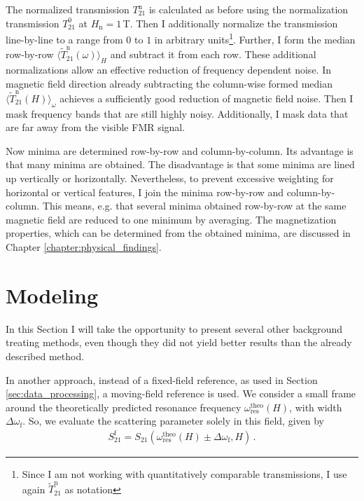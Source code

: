 The normalized transmission $T_{21}^\text{n}$ is calculated as before using the normalization transmission $T_{21}^0$ at $H_\text{n}=1\,$T. Then I additionally normalize the transmission line-by-line to a range from $0$ to $1$ in arbitrary units\footnote{Since I am not working with quantitatively comparable transmissions, I use again $\widetilde{T}_{21}^\text{n}$ as notation}. Further, I form the median row-by-row $\langle\widetilde{T}_{21}^\text{n}(\omega)\rangle_H$ and subtract it from each row. These additional normalizations allow an effective reduction of frequency dependent noise. In magnetic field direction already subtracting the column-wise formed median $\langle\widetilde{T}_{21}^\text{n}(H)\rangle_\omega$ achieves a sufficiently good reduction of magnetic field noise. Then I mask frequency bands that are still highly noisy. Additionally, I mask data that are far away from the visible FMR signal.

Now minima are determined row-by-row and column-by-column. Its advantage is that many minima are obtained. The disadvantage is that some minima are lined up vertically or horizontally. Nevertheless, to prevent excessive weighting for horizontal or vertical features, I join the minima row-by-row and column-by-column. This means, e.g. that several minima obtained row-by-row at the same magnetic field are reduced to one minimum by averaging. The magnetization properties, which can be determined from the obtained minima, are discussed in Chapter \ref{chapter:physical_findings}.

\section{Modeling}
In this Section I will take the opportunity to present several other background treating methods, even though they did not yield better results than the already described method.

In another approach, instead of a fixed-field reference, as used in Section \ref{sec:data_processing}, a {moving-field reference} is used. We consider a small frame around the theoretically predicted resonance frequency $\omega_\text{res}^\text{theo}(H)$, with width $\Delta\omega_\text{f}$. So, we evaluate the scattering parameter solely in this field, given by
\begin{align}
    S_{21}^\text{f}=S_{21}(\omega_\text{res}^\text{theo}(H)\pm\Delta\omega_\text{f},H)\,.
\end{align}

